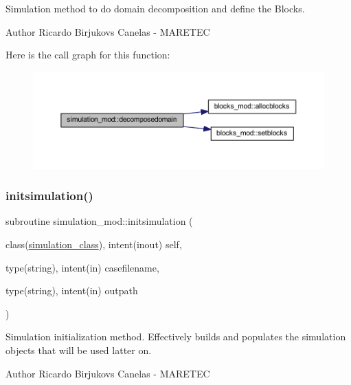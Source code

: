 Simulation method to do domain decomposition and define the Blocks. 

\begin{DoxyAuthor}{Author}
Ricardo Birjukovs Canelas -\/ M\+A\+R\+E\+T\+EC 
\end{DoxyAuthor}
Here is the call graph for this function\+:\nopagebreak
\begin{figure}[H]
\begin{center}
\leavevmode
\includegraphics[width=350pt]{namespacesimulation__mod_a2b8198a9fb3f7671c6b45192a0b9740c_cgraph}
\end{center}
\end{figure}
\mbox{\label{namespacesimulation__mod_aedbba2bb458cbcd7eb93938a5f7b5940}} 
\subsubsection{\texorpdfstring{initsimulation()}{initsimulation()}}
{\footnotesize\ttfamily subroutine simulation\+\_\+mod\+::initsimulation (\begin{DoxyParamCaption}\item[{class(\hyperlink{structsimulation__mod_1_1simulation__class}{simulation\+\_\+class}), intent(inout)}]{self,  }\item[{type(string), intent(in)}]{casefilename,  }\item[{type(string), intent(in)}]{outpath }\end{DoxyParamCaption})\hspace{0.3cm}{\ttfamily [private]}}



Simulation initialization method. Effectively builds and populates the simulation objects that will be used latter on. 

\begin{DoxyAuthor}{Author}
Ricardo Birjukovs Canelas -\/ M\+A\+R\+E\+T\+EC 
\end{DoxyAuthor}

